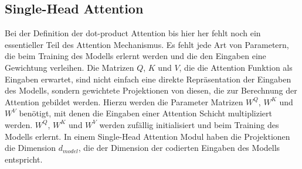 \documentclass[conference]{IEEEtran}
\begin{document}


\subsection{Single-Head Attention}
Bei der Definition der dot-product Attention bis hier her fehlt noch ein essentieller Teil des Attention Mechanismus. Es fehlt jede Art von Parametern, die beim Training des Modells erlernt werden und die den Eingaben eine Gewichtung verleihen. Die Matrizen $Q$, $K$ und $V$, die die Attention Funktion als Eingaben erwartet, sind nicht einfach eine direkte Repräsentation der Eingaben des Modells, sondern gewichtete Projektionen von diesen, die zur Berechnung der Attention gebildet werden. Hierzu werden die Parameter Matrizen $W^Q$, $W^K$ und $W^V$ benötigt, mit denen die Eingaben einer Attention Schicht multipliziert werden. $W^Q$, $W^K$ und $W^V$ werden zufällig initialisiert und beim Training des Modells erlernt. In einem Single-Head Attention Modul haben die Projektionen die Dimension $d_{model}$, die der Dimension der codierten Eingaben des Modells entspricht. \cite{attention_is_all_you_need}
\end{document}
